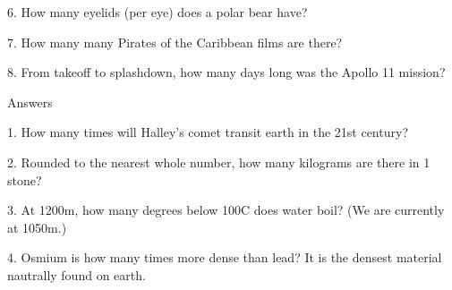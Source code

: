 \begin{frame}
\begin{center}
\Large
6. How many eyelids (per eye) does a polar bear have?
\end{center}
\end{frame}
\begin{frame}
\begin{center}
\Large
7. How many many Pirates of the Caribbean films are there?
\end{center}
\end{frame}
\begin{frame}
\begin{center}
\Large
8. From takeoff to splashdown, how many days long was the Apollo 11 mission?
\end{center}
\end{frame}
\begin{frame}
\begin{center}
\Huge
Answers
\end{center}
\end{frame}
\begin{frame}
\begin{center}
\Large
1. How many times will Halley's comet transit earth in the 21st century?
\\
\end{center}
\end{frame}
\begin{frame}
\begin{center}
\Large
2. Rounded to the nearest whole number, how many kilograms are there in 1 stone?
\\
\end{center}
\end{frame}
\begin{frame}
\begin{center}
\Large
3. At 1200m, how many degrees below 100\textdegree C does water boil? (We are currently at 1050m.)
\\
\end{center}
\end{frame}
\begin{frame}
\begin{center}
\Large
4. Osmium is how many times more dense than lead? It is the densest material nautrally found on earth.
\\
\end{center}
\end{frame}
